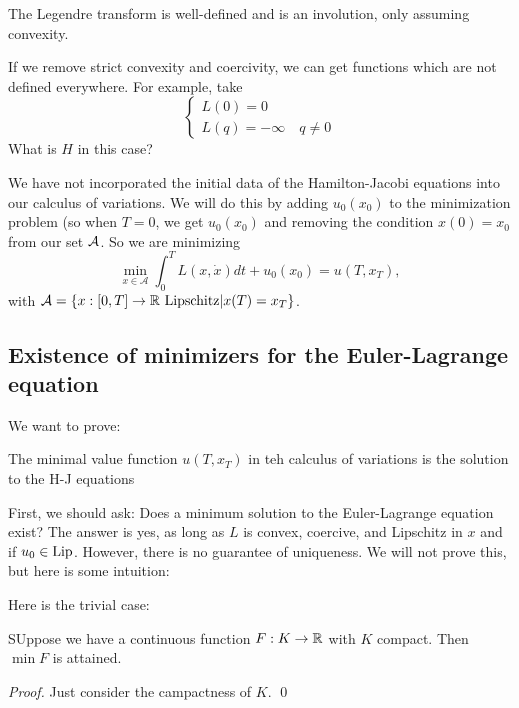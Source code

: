 \begin{remark}
The Legendre transform is well-defined and is an involution, only assuming convexity.
\end{remark}

\begin{example}
If we remove strict convexity and coercivity, we can get functions which are not defined everywhere. For example, take 
\[
\begin{cases}
    L(0) = 0\\
    L(q)= -\infty \quad q \neq 0
\end{cases}
\]
What is $H$ in this case?
\end{example}

We have not incorporated the initial data of the Hamilton-Jacobi equations into our
calculus of variations. We will do this by adding $u_0(x_0)$ to the minimization problem (so when $T=0$, we get $u_0(x_0)$ and removing the condition $x(0)=x_0$ from our set $\mathcal{A}$. So we are minimizing 
\begin{equation}
    \label{eq: E-L}
    \min _{x \in \mathcal{A}} \int_{0}^{T} L(x, \dot{x}) d t+u_{0}\left(x_{0}\right)=u\left(T, x_{T}\right),
\end{equation}
with $\mathcal{A} = \{x: [0,T] \to \mathbb{R} \text{ Lipschitz}| x(T) = x_T\}$.

\subsection{Existence of minimizers for the Euler-Lagrange equation}
We want to prove:
\begin{theorem}
    The minimal value function $u(T, x_T)$ in teh calculus of variations is the solution to the H-J equations
\end{theorem}

First, we should ask: Does a minimum solution to the Euler-Lagrange equation exist? The answer is yes, as long as $L$ is convex, coercive, and Lipschitz in $x$ and if $u_0\in \operatorname{Lip}$. However, there is no guarantee of uniqueness. We will not prove this, but here is some intuition: 

Here is  the trivial case: 
\begin{proposition}
    SUppose we have a continuous function $F:K\to \mathbb{R}$ with $K$ compact. Then $\min F$ is attained.
\end{proposition}
\begin{proof}
    Just consider the campactness of $K$. \qed 
\end{proof}

